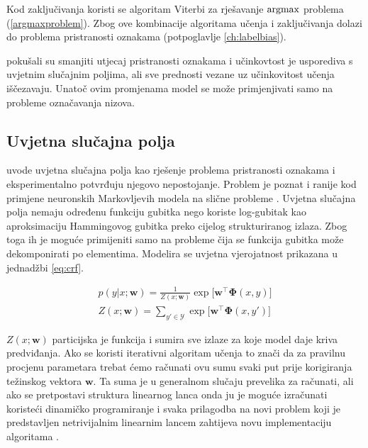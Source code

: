 Kod zaključivanja koristi se algoritam Viterbi za rješavanje $\operatorname*{argmax}$ problema
(\ref{argmaxproblem}). Zbog ove kombinacije algoritama učenja i zaključivanja
dolazi do problema pristranosti oznakama (potpoglavlje \ref{ch:labelbias}).

\cite{cohen05ijcai} pokušali su smanjiti utjecaj pristranosti oznakama i
učinkovtost je usporediva s uvjetnim slučajnim poljima, ali sve prednosti vezane
uz učinkovitost učenja iščezavaju. Unatoč ovim promjenama model se može
primjenjivati samo na probleme označavanja nizova.


\subsection{Uvjetna slučajna polja}

\citet*{lafferty2001conditional} uvode uvjetna slučajna polja kao rješenje
problema pristranosti oznakama i eksperimentalno potvrđuju njegovo nepostojanje.
Problem je poznat i ranije kod primjene neuronskih Markovljevih modela na slične
probleme \citep{leon1991approche}. Uvjetna slučajna polja nemaju određenu
funkciju gubitka nego koriste log-gubitak kao aproksimaciju Hammingovog gubitka
preko cijelog strukturiranog izlaza. Zbog toga ih je moguće primijeniti samo na
probleme čija se funkcija gubitka može dekomponirati po elementima. Modelira se
uvjetna vjerojatnost prikazana u jednadžbi \ref{eq:crf}.

\begin{equation}\label{eq:crf}
\begin{aligned}
  p(y | x; \mathbf{w}) = \frac{1}{Z(x; \mathbf{w})} \exp \big[ \mathbf{w}^\top \mathbf{\Phi}(x, y)\big] \\
  Z(x; \mathbf{w}) = \sum_{y' \in \mathcal{Y}} \exp \big[ \mathbf{w}^\top \mathbf{\Phi}(x, y')\big]
\end{aligned}
\end{equation}

$Z(x; \mathbf{w})$ particijska je funkcija i sumira sve izlaze za koje model
daje kriva predviđanja. Ako se koristi iterativni algoritam učenja to znači da
za pravilnu procjenu parametara trebat ćemo računati ovu sumu svaki put prije
korigiranja težinskog vektora $\mathbf{w}$. Ta suma je u generalnom slučaju
prevelika za računati, ali ako se pretpostavi struktura linearnog lanca onda ju
je moguće izračunati koristeći dinamičko programiranje i svaka prilagodba na
novi problem koji je predstavljen netrivijalnim linearnim lancem zahtijeva novu
implementaciju algoritama \citep{lafferty2001conditional, sha2003shallow}.


